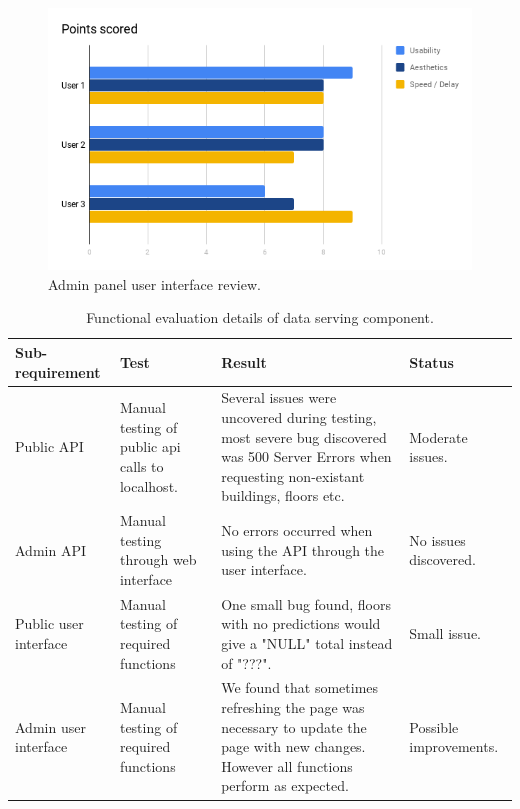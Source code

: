 \documentclass{l4proj}
\begin{document}
\begin{figure}
\centering
\includegraphics[width=\textwidth]{adminrev}
\caption{Admin panel user interface review.}
\label{fig:adminrev}
\end{figure}




\begin{table}
\begin{tabularx}{\textwidth}{|X|X|X|X|}
\hline
\textbf{Sub-requirement} & \textbf{Test} & \textbf{Result} & \textbf{Status}\tabularnewline
\hline
Public API & Manual testing of public api calls to localhost. & Several issues were uncovered during testing, most severe bug discovered was 500 Server Errors when requesting non-existant buildings, floors etc. & Moderate issues. \\
\hline
Admin API & Manual testing through web interface & No errors occurred when using the API through the user interface. & No issues discovered. \\
\hline
Public user interface & Manual testing of required functions & One small bug found, floors with no predictions would give a "NULL" total instead of "???". & Small issue. \\
\hline
Admin user interface & Manual testing of required functions & We found that sometimes refreshing the page was necessary to update the page with new changes. However all functions perform as expected. & Possible improvements. \\
\hline
\end{tabularx}
\caption{Functional evaluation details of data serving component.}
\label{table:evaldata}
\end{table}


\end{document}
